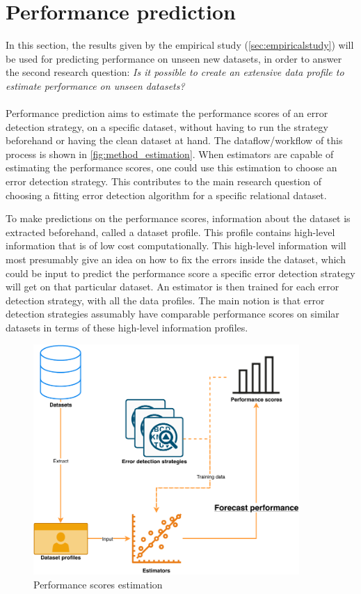 \newpage
\section{Performance prediction}
\label{sec:performanceprediction}
In this section, the results given by the empirical study (\autoref{sec:empiricalstudy}) will be used for predicting performance on unseen new datasets, in order to answer the second research question: \textit{Is it possible to create an extensive data profile to estimate performance on unseen datasets?}
~\\~\\Performance prediction aims to estimate the performance scores of an error detection strategy, on a specific dataset, without having to run the strategy beforehand or having the clean dataset at hand. The dataflow/workflow of this process is shown in \autoref{fig:method_estimation}.
When estimators are capable of estimating the performance scores, one could use this estimation to choose an error detection strategy. This contributes to the main research question of choosing a fitting error detection algorithm for a specific relational dataset.

To make predictions on the performance scores, information about the dataset is extracted beforehand, called a dataset profile. This profile contains high-level information that is of low cost computationally. This high-level information will most presumably give an idea on how to fix the errors inside the dataset, which could be input to predict the performance score a specific error detection strategy will get on that particular dataset. An estimator is then trained for each error detection strategy, with all the data profiles. The main notion is that error detection strategies assumably have comparable performance scores on similar datasets in terms of these high-level information profiles. 

\begin{figure}[h]
	\centering
	\includegraphics[width=0.9\textwidth]{thesis/Figures/Method/PerformanceEstimation-Profiler.pdf}
	\caption{Performance scores estimation}
	\label{fig:method_estimation}
\end{figure}

